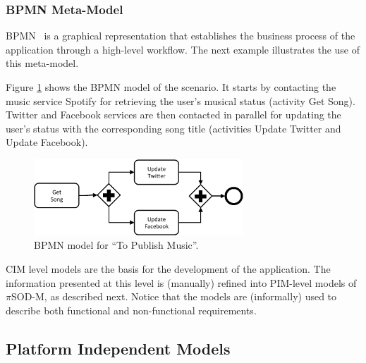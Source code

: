 \documentclass{singlecol-new}
\theoremstyle{TH}{
\newtheorem{lemma}{Lemma}
\newtheorem{theorem}[lemma]{Theorem}
\newtheorem{corrolary}[lemma]{Corrolary}
\newtheorem{conjecture}[lemma]{Conjecture}
\newtheorem{proposition}[lemma]{Proposition}
\newtheorem{claim}[lemma]{Claim}
\newtheorem{stheorem}[lemma]{Wrong Theorem}
\newtheorem{algorithm}{Algorithm}
}
\theoremstyle{THrm}{
\newtheorem{definition}{Definition}[section]
\newtheorem{question}{Question}[section]
\newtheorem{remark}{Remark}
\newtheorem{scheme}{Scheme}
}
\theoremstyle{THhit}{
\newtheorem{case}{Case}[section]
}
\theoremstyle{THhsl}{
\newtheorem{example}{Example}
}
\newcommand{\pisodm}[0]{$\pi$SOD-M\xspace}
\begin{document}
\subsubsection{BPMN Meta-Model}

BPMN~\cite{BPMN}  is a graphical representation that establishes the business process of the application through a high-level workflow\footnotemark {}.
The next example illustrates the use of this meta-model.

\begin{example}\label{ex:toPublicMusicBPMN}
Figure \ref{fig:CIM:tpmbpmn} shows the BPMN model of the scenario.
It starts by contacting the music service Spotify for retrieving the user's  musical status (activity {\sf Get Song}).
Twitter and Facebook services are then contacted in parallel for updating the user's status with the corresponding song title (activities {\sf Update Twitter} and {\sf Update Facebook}).
\end{example}
%
\begin{figure}[h]
\center
\includegraphics[width=0.7\textwidth]{./figures/SC.pdf}
\caption{\label{fig:CIM:tpmbpmn} BPMN model for ``To Publish Music''.}
\end{figure}

CIM level models are the basis for the development of the application.
The information presented at this level is (manually) refined into PIM-level models of \pisodm, as described next.
Notice that the models are (informally) used to describe both functional and non-functional requirements.

\subsection{Platform Independent Models}
\end{document}
